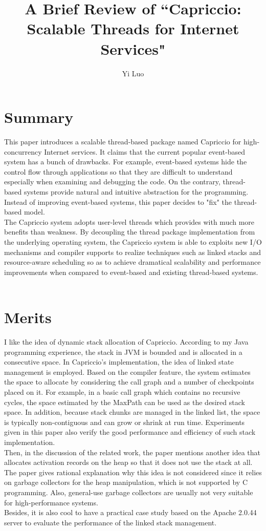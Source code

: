 \documentclass[10pt, letterpaper]{article}
\title{A Brief Review of ``Capriccio: Scalable Threads for Internet Services"}
\author{Yi Luo}
\date{} %
\begin{document}
\maketitle

\section{Summary}
\label{sec-summary}
This paper introduces a scalable thread-based package named Capriccio for high-concurrency Internet services. It claims that the current popular event-based system has a bunch of drawbacks. For example, event-based systems hide the control flow through applications so that they are difficult to understand especially when examining and debugging the code. On the contrary, thread-based systems provide natural and intuitive abstraction for the programming. Instead of improving event-based systems, this paper decides to "fix" the thread-based model.
\\The Capriccio system adopts user-level threads which provides with much more benefits than weakness. By decoupling the thread package implementation from the underlying operating system, the Capriccio system is able to exploits new I/O mechanisms and compiler supports to realize techniques such as linked stacks and resource-aware scheduling so as to achieve dramatical scalability and performance improvements when compared to event-based and existing thread-based systems. 
~\cite{rob2003capriccio}

\section{Merits}
\label{sec-merits}
I like the idea of dynamic stack allocation of Capriccio. According to my Java programming experience, the stack in JVM is bounded and is allocated in a consecutive space. In Capriccio's implementation, the idea of linked state management is employed. Based on the compiler feature, the system estimates the space to allocate by considering the call graph and a number of checkpoints placed on it. For example, in a basic call graph which contains no recursive cycles, the space estimated by the MaxPath can be used as the desired stack space. In addition, because stack chunks are managed in the linked list, the space is typically non-contiguous and can grow or shrink at run time. Experiments given in this paper also verify the good performance and efficiency of such stack implementation.
\\Then, in the discussion of the related work, the paper mentions another idea that allocates activation records on the heap so that it does not use the stack at all. The paper gives rational explanation why this idea is not considered since it relies on garbage collectors for the heap manipulation, which is not supported by C programming. Also, general-use garbage collectors are usually not very suitable for high-performance systems.
\\Besides, it is also cool to have a practical case study based on the Apache 2.0.44 server to evaluate the performance of the linked stack management. 
\end{document}
